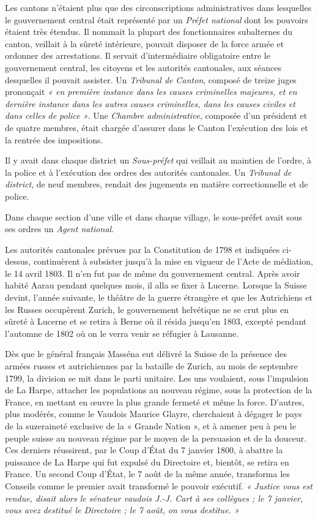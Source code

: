 \documentclass[french,twoside]{book} %
\begin{document}
Les cantons n’étaient plus que des circonscriptions administratives dans lesquelles le gouvernement central était représenté par un \emph{Préfet national} dont les pouvoirs étaient très étendus. Il nommait la plupart des fonctionnaires subalternes du canton, veillait à la sûreté intérieure, pouvait disposer de la force armée et ordonner des arrestations. Il servait d’intermédiaire obligatoire entre le gouvernement central, les citoyens et les autorités cantonales, aux séances desquelles il pouvait assister. Un \emph{Tribunal de Canton}, composé de treize juges prononçait \emph{« en première instance dans les causes criminelles majeures, et en dernière instance dans les autres causes criminelles, dans les causes civiles et dans celles de police »}. Une \emph{Chambre administrative}, composée d’un président et de quatre membres, était chargée d’assurer dans le Canton l’exécution des lois et la rentrée des impositions.\par
Il y avait dans chaque district un \emph{Sous-préfet} qui veillait au maintien de l’ordre, à la police et à l’exécution des ordres des autorités cantonales. Un \emph{Tribunal de district}, de neuf membres, rendait des jugements en matière correctionnelle et de police.\par
Dans chaque section d’une ville et dans chaque village, le sous-préfet avait sous ses ordres un \emph{Agent national.}\par
Les autorités cantonales prévues par la Constitution de 1798 et indiquées ci-dessus, continuèrent à subsister jusqu’à la mise en vigueur de l’Acte de médiation, le 14 avril 1803. Il n’en fut pas de même du gouvernement central. Après avoir habité Aarau pendant quelques mois, il alla se fixer à Lucerne. Lorsque la Suisse devint, l’année suivante, le théâtre de la guerre étrangère et que les Autrichiens et les Russes occupèrent Zurich, le gouvernement helvétique ne se crut plus en sûreté à Lucerne et se retira à Berne où il résida jusqu’en 1803, excepté pendant l’automne de 1802 où on le verra venir se réfugier à Lausanne.\par
Dès que le général français Masséna eut délivré la Suisse de la présence des armées russes et autrichiennes par la bataille de Zurich, au mois de septembre 1799, la division se mit dans le parti unitaire. Les uns voulaient, sous l’impulsion de La Harpe, attacher les populations au nouveau régime, sous la protection de la France, en mettant en œuvre la plus grande fermeté et même la force. D’autres, plus modérés, comme le Vaudois Maurice Glayre, cherchaient à dégager le pays de la suzeraineté exclusive de la « Grande Nation », et à amener peu à peu le peuple suisse au nouveau régime par le moyen de la persuasion et de la douceur. Ces derniers réussirent, par le Coup d’État du 7 janvier 1800, à abattre la puissance de La Harpe qui fut expulsé du Directoire et, bientôt, se retira en France. Un second Coup d’État, le 7 août de la même année, transforma les Conseils comme le premier avait transformé le pouvoir exécutif. \emph{« Justice vous est rendue, disait alors le sénateur vaudois J.-J. Cart à ses collègues ; le 7 janvier, vous avez destitué le Directoire ; le 7 août, on vous destitue. »}\par
\end{document}
